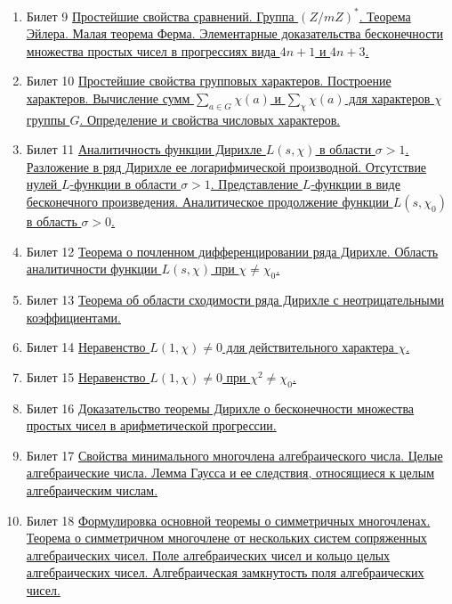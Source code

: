 \documentclass[a4paper,12pt]{article}
\newcommand{\os}{\left(}
\newcommand{\cs}{\right)}
\begin{document}
\begin{enumerate}
\item{Билет 9}
\hyperlink{bil9}{Простейшие свойства сравнений. Группа $\os Z/mZ \cs ^*$. Теорема Эйлера. Малая теорема Ферма. Элементарные доказательства бесконечности множества простых чисел в прогрессиях вида $4n+1$ и $4n+3$.}

\item{Билет 10}
\hyperlink{bil10}{Простейшие свойства групповых характеров. Построение характеров. Вычисление сумм $\sum_{a\in G} \chi(a)$ и $\sum_\chi \chi(a)$ для характеров $\chi$ группы $G$. Определение и свойства числовых характеров.}

\item{Билет 11}
\hyperlink{bil11}{Аналитичность функции Дирихле $L(s,\chi)$ в области $\sigma > 1$. Разложение в ряд Дирихле ее логарифмической производной. Отсутствие нулей $L$-функции в области $\sigma > 1$. Представление $L$-функции в виде бесконечного произведения. Аналитическое продолжение функции $L(s,\chi_0)$ в область $\sigma > 0$.}


\item{Билет 12}
\hyperlink{bil12}{Теорема о почленном дифференцировании ряда Дирихле. Область аналитичности функции $L(s, \chi)$ при $\chi \not= \chi_0$.}

\item{Билет 13}
\hyperlink{bil13}{Теорема об области сходимости ряда Дирихле с неотрицательными коэффициентами.}

\item{Билет 14}
\hyperlink{bil14}{Неравенство $L(1,\chi)\not=0$ для действительного характера $\chi$.}

\item{Билет 15}
\hyperlink{bil15}{Неравенство $L(1,\chi)\not=0$ при $\chi^2\not=\chi_0$.}


\item{Билет 16}
\hyperlink{bil16}{Доказательство теоремы Дирихле о бесконечности множества простых чисел в арифметической прогрессии.}

\item{Билет 17}
\hyperlink{bil17}{Свойства минимального многочлена алгебраического числа. Целые алгебраические числа. Лемма Гаусса и ее следствия, относящиеся к целым алгебраическим числам.}

\item{Билет 18}
\hyperlink{bil18}{Формулировка основной теоремы о симметричных многочленах. Теорема о симметричном многочлене от нескольких систем сопряженных алгебраических чисел. Поле алгебраических чисел и кольцо целых алгебраических чисел. Алгебраическая замкнутость поля алгебраических чисел.}


\end{enumerate}
\end{document}
